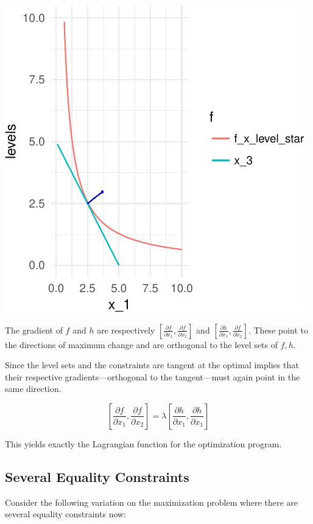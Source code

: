 \documentclass[11pt,]{article}
\begin{document}
\begin{center}\includegraphics{Optimization_2_files/figure-latex/opt_dim_2_eq_grad-1} \end{center}

The gradient of \(f\) and \(h\) are respectively
\([\frac{\partial f}{\partial x_1}, \frac{\partial f}{\partial x_2}]\)
and
\([\frac{\partial h}{\partial x_1}, \frac{\partial f}{\partial x_2}]\).
These point to the directions of maximum change and are orthogonal to
the level sets of \(f, h\).

Since the level sets and the constraints are tangent at the optimal
implies that their respective gradients---orthogonal to the
tangent---must again point in the same direction.

\[
[\frac{\partial f}{\partial x_1}, \frac{\partial f}{\partial x_2}] = 
\lambda [\frac{\partial h}{\partial x_1}, \frac{\partial h}{\partial x_1}]
\]

This yields exactly the Lagrangian function for the optimization
program.

\subsection{Several Equality
Constraints}\label{several-equality-constraints}

Consider the following variation on the maximization problem where there
are several equality constraints now:
\end{document}
